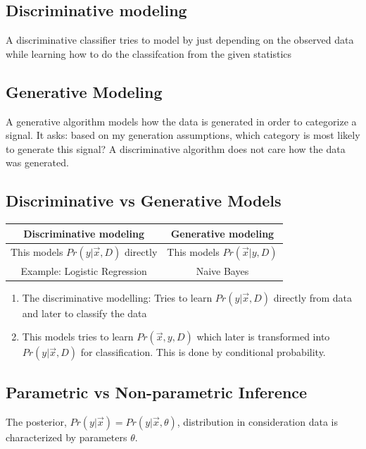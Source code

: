 \documentclass[12pt]{article}
\numberwithin{equation}{section}
\begin{document}
\subsection{Discriminative modeling}
A discriminative classifier tries to model by just depending on the observed data while learning how to do the classifcation from the given statistics

\subsection{Generative Modeling}
A generative algorithm models how the data is generated in order to categorize a signal. It asks: based on my generation assumptions, which category is most likely to generate this signal? A discriminative  algorithm does not care how the data was generated.

\subsection{Discriminative vs Generative Models}
\begin{table}[!ht]
\begin{center}
\begin{tabular}{|c|c|}
\hline
\textbf{Discriminative modeling}  & \textbf{Generative modeling} \\ \hline
This models $Pr(y|\vec{x},D)$ directly & This models $Pr(\vec{x}|y,D)$ \\ \hline
Example: Logistic Regression & Naive Bayes\\ \hline
\end{tabular}
\end{center}
\label{default}
\end{table}%
\begin{enumerate}
\item The discriminative modelling:  Tries to learn $Pr(y|\vec{x},D)$ directly from data and later to classify the data
\item This models tries to learn $Pr(\vec{x},y,D)$ which later is transformed into $Pr(y | \vec{x},D)$  for classification. This is done by conditional probability.
\end{enumerate}



\subsection{Parametric vs Non-parametric Inference}
The posterior, $Pr(y|\vec{x}) = Pr(y|\vec{x},\theta)$, distribution in consideration data is characterized by parameters $\theta$.
\end{document}
